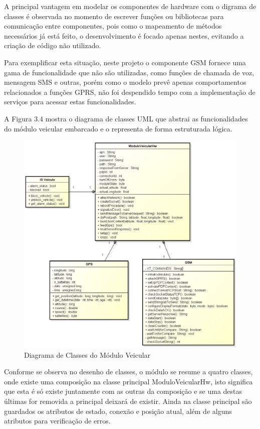 A principal vantagem em modelar os componentes de hardware com o digrama de classes é observada
no momento de escrever funções ou bibliotecas para comunicação entre componentes, pois como o 
mapeamento de métodos necessários já está feito, o desenvolvimento é focado apenas nestes,
evitando a criação de código não utilizado. 

Para exemplificar esta situação, neste projeto o componente GSM fornece uma gama de funcionalidade 
que não são utilizadas, como funções de chamada de voz, mensagem SMS e outras,
porém como o modelo prevê apenas comportamentos relacionados a funções GPRS,
não foi despendido tempo com a implementação de serviços para acessar estas funcionalidades. 

A Figura 3.4 mostra o diagrama de classes UML que abstrai as funcionalidades do módulo veicular embarcado e 
o representa de forma estruturada lógica.

\newpage

\begin{figure}[!htb]
\centering
\includegraphics[width=\textwidth]{figures/5_mod_veicular.png}
\caption{Diagrama de Classes do Módulo Veicular}
\label{1}
\end{figure}

Conforme se observa no desenho de classes, o módulo se resume a quatro classes, onde existe uma composição na classe principal ModuloVeicularHw, isto significa que esta é só existe juntamente com as outras da composição e se uma destas últimas for removida a principal deixará de existir. Ainda na classe principal são guardados os atributos de estado, conexão e posição atual, além de alguns atributos para verificação de erros.

